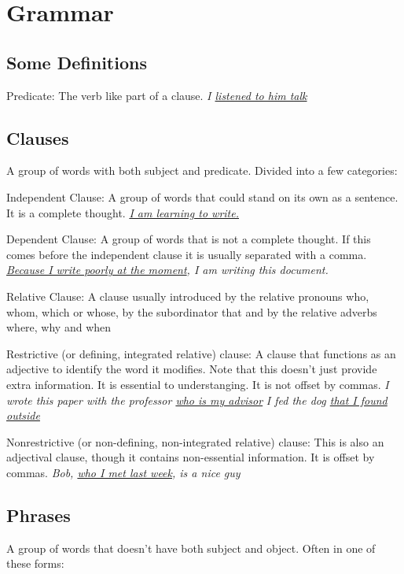 \documentclass{article}
\newcommand{\hl}[1]{\underline{#1}}
\newcommand{\example}[1]{\newline \textit{#1}}
\begin{document}
\section{Grammar}


\subsection{Some Definitions}

Predicate: The verb like part of a clause.
\example{I \hl{listened to him talk}}

\subsection{Clauses}

A group of words with both subject and predicate. Divided into a few categories:

Independent Clause: A group of words that could stand on its own as a sentence. It is a complete thought.
\example{\hl{I am learning to write.}}


Dependent Clause: A group of words that is not a complete thought. If this comes before the independent clause it is usually separated with a comma.
\example{\hl{Because I write poorly at the moment}, I am writing this document.}

Relative Clause: A clause usually introduced by the relative pronouns who, whom, which or whose, by the subordinator that and by the relative adverbs where, why and when


Restrictive (or defining, integrated relative) clause: A clause that functions as an adjective to identify the word it modifies. Note that this doesn't just provide extra information. It is essential to understanging. It is not offset by commas.
\example{I wrote this paper with the professor \hl{who is my advisor}}
\example{I fed the dog \hl{that I found outside}}

Nonrestrictive (or non-defining, non-integrated relative) clause: This is also an adjectival clause, though it contains non-essential information. It is offset by commas.
\example{Bob, \hl{who I met last week}, is a nice guy}


\subsection{Phrases}

A group of words that doesn't have both subject and object. Often in one of these forms:
\end{document}
